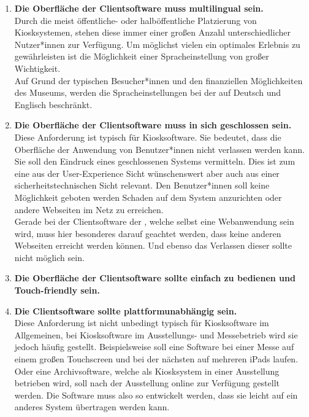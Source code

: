 \begin{enumerate}[label=\textbf{NFA\arabic*}]
  \item\label{nfa3} \textbf{Die Oberfläche der Clientsoftware muss multilingual sein.}\\
  Durch die meist öffentliche- oder halböffentliche Platzierung von Kiosksystemen, stehen diese
  immer einer großen Anzahl unterschiedlicher Nutzer*innen zur Verfügung. Um möglichst vielen
  ein optimales Erlebnis zu gewährleisten ist die Möglichkeit einer Spracheinstellung von großer Wichtigkeit.\\
  Auf Grund der typischen Besucher*innen und den finanziellen Möglichkeiten des Museums, werden die 
  Spracheinstellungen bei der \shst{} auf Deutsch und Englisch beschränkt.
  \item\label{nfa4} \textbf{Die Oberfläche der Clientsoftware muss in sich geschlossen sein.}\\
  Diese Anforderung ist typisch für Kiosksoftware. Sie bedeutet, dass die Oberfläche der Anwendung von Benutzer*innen 
  nicht verlassen werden kann. Sie soll den Eindruck eines geschlossenen Systems vermitteln. Dies ist zum eine
  aus der User-Experience Sicht wünschenswert aber auch aus einer sicherheitstechnischen Sicht relevant. Den 
  Benutzer*innen soll keine Möglichkeit geboten werden Schaden auf dem System anzurichten oder andere Webseiten
  im Netz zu erreichen.\\
  Gerade bei der Clientsoftware der \shst{}, welche selbst eine Webanwendung sein wird, muss hier besonderes darauf
  geachtet werden, dass keine anderen Webseiten erreicht werden können. Und ebenso das Verlassen dieser sollte
  nicht möglich sein.
  \item\label{nfa5} \textbf{Die Oberfläche der Clientsoftware sollte einfach zu bedienen und Touch-friendly sein.}\\
  \item\label{nfa6} \textbf{Die Clientsoftware sollte plattformunabhängig sein.}\\
  Diese Anforderung ist nicht unbedingt typisch für Kiosksoftware im Allgemeinen, bei Kiosksoftware im Ausstellungs- und
  Messebetrieb wird sie jedoch häufig gestellt. Beispielsweise soll eine Software bei einer Messe auf einem
  großen Touchscreen und bei der nächsten auf mehreren iPads laufen. Oder eine Archivsoftware, welche als Kiosksystem
  in einer Ausstellung betrieben wird, soll nach der Ausstellung online zur Verfügung gestellt werden. Die Software
  muss also so entwickelt werden, dass sie leicht auf ein anderes System übertragen werden kann. \\ 

\end{enumerate}
